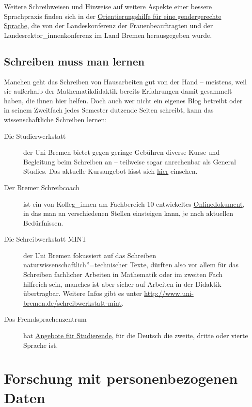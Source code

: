 \documentclass[
  bibliography=totoc,
  oneside,
  12pt,
  a4paper]{scrbook}
\begin{document}
Weitere Schreibweisen und Hinweise auf weitere Aspekte einer bessere Sprachpraxis finden sich in der \href{https://www.uni-bremen.de/fileadmin/user_upload/sites/zentrale-frauenbeauftragte/UfHuql-OrientierungshilfeFuerGendergerechteSprache.pdf}{Orientierungshilfe für eine gendergerechte Sprache}, die von der Landeskonferenz der Frauenbeauftragten und der Landesrektor\_innenkonferenz im Land Bremen herausgegeben wurde.

\hypertarget{schreiben-muss-man-lernen}{%
\section{Schreiben muss man lernen}\label{schreiben-muss-man-lernen}}

Manchen geht das Schreiben von Hausarbeiten gut von der Hand -- meistens,
weil sie außerhalb der Mathematikdidaktik bereits Erfahrungen damit
gesammelt haben, die ihnen hier helfen. Doch auch wer nicht ein eigenes
Blog betreibt oder in seinem Zweitfach jedes Semester dutzende Seiten
schreibt, kann das wissenschaftliche Schreiben lernen:

\begin{description}
\item[Die Studierwerkstatt]
der Uni Bremen bietet gegen geringe Gebühren diverse Kurse und
Begleitung beim Schreiben an -- teilweise sogar anrechenbar als
General Studies. Das aktuelle Kursangebot lässt sich \href{https://www.uni-bremen.de/studierwerkstatt/}{hier} einsehen.
\item[Der Bremer Schreibcoach]
ist ein von Kolleg\_innen am Fachbereich 10 entwickeltes
\href{http://www.fb10.uni-bremen.de/homepages/krings/Der_Bremer_Schreibcoach.pdf}{Onlinedokument}, in das man an verschiedenen Stellen einsteigen kann, je nach aktuellen Bedürfnissen.
\item[Die Schreibwerkstatt MINT]
der Uni Bremen fokussiert auf das Schreiben
naturwissenschaftlich''=technischer Texte, dürften also vor allem für
das Schreiben fachlicher Arbeiten in Mathematik oder im zweiten Fach
hilfreich sein, manches ist aber sicher auf Arbeiten in der
Didaktik übertragbar. Weitere Infos gibt es unter
\url{http://www.uni-bremen.de/schreibwerkstatt-mint}.
\item[Das Fremdsprachenzentrum]
hat \href{http://www.fremdsprachenzentrum-bremen.de}{Angebote für Studierende}, für die Deutsch die zweite, dritte
oder vierte Sprache ist.
\end{description}

\hypertarget{forschung-mit-personenbezogenen-daten}{%
\chapter{Forschung mit personenbezogenen Daten}\label{forschung-mit-personenbezogenen-daten}}
\end{document}
